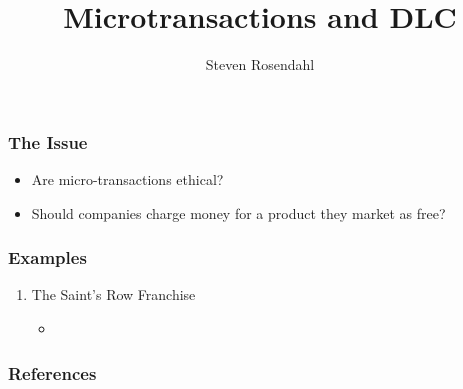 \documentclass{beamer}
\title{Microtransactions and DLC}
\author{Steven Rosendahl}
\date{}
\begin{document}
\frame{\titlepage}

\begin{frame}
\frametitle{The Issue}
\begin{itemize}
\pause
\item Are micro-transactions ethical?
\pause
\item Should companies charge money for a product they market as free?
\end{itemize}
\end{frame}

\begin{frame}
\frametitle{Examples}
\pause
\begin{enumerate}
\item The Saint's Row Franchise
\pause
\begin{itemize}
\item
\end{itemize}
\end{enumerate}
\end{frame}

\begin{frame}[allowframebreaks]
\frametitle{References}


\end{frame}
\end{document}
